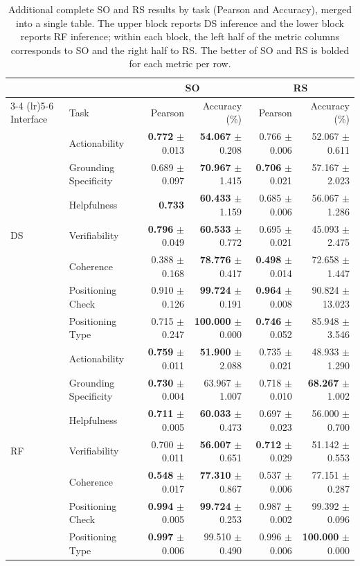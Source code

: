 \begin{table}[t]
\centering
\normalsize
\setlength{\tabcolsep}{4pt}
\begin{tabular}{llrrrr}
\toprule
& & \multicolumn{2}{c}{SO} & \multicolumn{2}{c}{RS} \\
\cmidrule(lr){3-4} \cmidrule(lr){5-6}
Interface & Task & Pearson & Accuracy (\%) & Pearson & Accuracy (\%) \\
\midrule
\multirow{7}{*}{DS} & Actionability & \textbf{0.772} $\pm$ 0.013 & \textbf{54.067} $\pm$ 0.208 & 0.766 $\pm$ 0.006 & 52.067 $\pm$ 0.611 \\
& Grounding Specificity & 0.689 $\pm$ 0.097 & \textbf{70.967} $\pm$ 1.415 & \textbf{0.706} $\pm$ 0.021 & 57.167 $\pm$ 2.023 \\
& Helpfulness & \textbf{0.733} & \textbf{60.433} $\pm$ 1.159 & 0.685 $\pm$ 0.006 & 56.067 $\pm$ 1.286 \\
& Verifiability & \textbf{0.796} $\pm$ 0.049 & \textbf{60.533} $\pm$ 0.772 & 0.695 $\pm$ 0.021 & 45.093 $\pm$ 2.475 \\
& Coherence & 0.388 $\pm$ 0.168 & \textbf{78.776} $\pm$ 0.417 & \textbf{0.498} $\pm$ 0.014 & 72.658 $\pm$ 1.447 \\
& Positioning Check & 0.910 $\pm$ 0.126 & \textbf{99.724} $\pm$ 0.191 & \textbf{0.964} $\pm$ 0.008 & 90.824 $\pm$ 13.023 \\
& Positioning Type & 0.715 $\pm$ 0.247 & \textbf{100.000} $\pm$ 0.000 & \textbf{0.746} $\pm$ 0.052 & 85.948 $\pm$ 3.546 \\
\midrule
\multirow{7}{*}{RF} & Actionability & \textbf{0.759} $\pm$ 0.011 & \textbf{51.900} $\pm$ 2.088 & 0.735 $\pm$ 0.021 & 48.933 $\pm$ 1.290 \\
& Grounding Specificity & \textbf{0.730} $\pm$ 0.004 & 63.967 $\pm$ 1.007 & 0.718 $\pm$ 0.010 & \textbf{68.267} $\pm$ 1.002 \\
& Helpfulness & \textbf{0.711} $\pm$ 0.005 & \textbf{60.033} $\pm$ 0.473 & 0.697 $\pm$ 0.023 & 56.000 $\pm$ 0.700 \\
& Verifiability & 0.700 $\pm$ 0.011 & \textbf{56.007} $\pm$ 0.651 & \textbf{0.712} $\pm$ 0.029 & 51.142 $\pm$ 0.553 \\
& Coherence & \textbf{0.548} $\pm$ 0.017 & \textbf{77.310} $\pm$ 0.867 & 0.537 $\pm$ 0.006 & 77.151 $\pm$ 0.287 \\
& Positioning Check & \textbf{0.994} $\pm$ 0.005 & \textbf{99.724} $\pm$ 0.253 & 0.987 $\pm$ 0.002 & 99.392 $\pm$ 0.096 \\
& Positioning Type & \textbf{0.997} $\pm$ 0.006 & 99.510 $\pm$ 0.490 & 0.996 $\pm$ 0.006 & \textbf{100.000} $\pm$ 0.000 \\
\bottomrule
\end{tabular}
\caption{Additional complete SO and RS results by task (Pearson and Accuracy), merged into a single table. The upper block reports DS inference and the lower block reports RF inference; within each block, the left half of the metric columns corresponds to SO and the right half to RS. The better of SO and RS is bolded for each metric per row.}
\label{tab:full-so-rs-secondary-merged}
\end{table}

